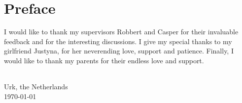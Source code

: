 
\chapter{\label{chap:Preface}Preface}
I would like to thank my supervisors Robbert and Casper for their invaluable feedback and for the interesting discussions.
I give my special thanks to my girlfriend Justyna, for her neverending love, support and patience.
Finally, I would like to thank my parents for their endless love and support.

\vspace{1cm}
\begin{flushright}
\theauthor{}\\
Urk, the Netherlands\\
\today{}\\
\end{flushright}
